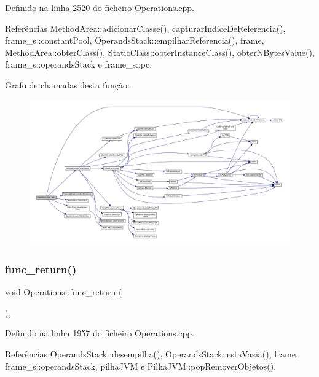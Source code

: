 Definido na linha 2520 do ficheiro Operations.\+cpp.



Referências Method\+Area\+::adicionar\+Classe(), capturar\+Indice\+De\+Referencia(), frame\+\_\+s\+::constant\+Pool, Operands\+Stack\+::empilhar\+Referencia(), frame, Method\+Area\+::obter\+Class(), Static\+Class\+::obter\+Instance\+Class(), obter\+N\+Bytes\+Value(), frame\+\_\+s\+::operands\+Stack e frame\+\_\+s\+::pc.

Grafo de chamadas desta função\+:\nopagebreak
\begin{figure}[H]
\begin{center}
\leavevmode
\includegraphics[width=350pt]{classOperations_a7594e147407e1f4ede57229899fd17d6_cgraph}
\end{center}
\end{figure}
\mbox{\label{classOperations_aa33b77fb62f7e76c347503c97c6b080b}} 
\subsubsection{\texorpdfstring{func\+\_\+return()}{func\_return()}}
{\footnotesize\ttfamily void Operations\+::func\+\_\+return (\begin{DoxyParamCaption}{ }\end{DoxyParamCaption})\hspace{0.3cm}{\ttfamily [static]}, {\ttfamily [private]}}



Definido na linha 1957 do ficheiro Operations.\+cpp.



Referências Operands\+Stack\+::desempilha(), Operands\+Stack\+::esta\+Vazia(), frame, frame\+\_\+s\+::operands\+Stack, pilha\+J\+VM e Pilha\+J\+V\+M\+::pop\+Remover\+Objetos().

